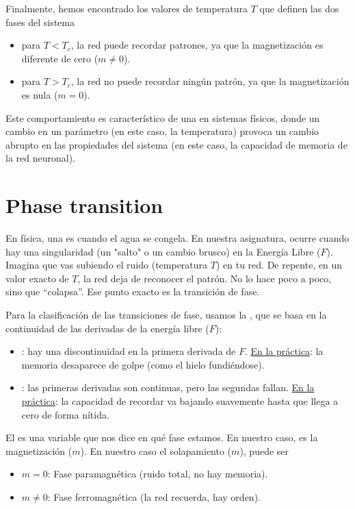 \noindent
Finalmente, hemos encontrado los valores de temperatura $T$ que definen las dos fases del sistema
\begin{itemize}
    \item {} para $T < T_c$, la red puede recordar patrones, ya que la magnetización es diferente de cero ($m \neq 0$).
    \item {} para $T > T_c$, la red no puede recordar ningún patrón, ya que la magnetización es nula ($m = 0$).
\end{itemize}
Este comportamiento es característico de una  en sistemas físicos, donde un cambio en un parámetro (en este caso, la temperatura) provoca un cambio abrupto en las propiedades del sistema (en este caso, la capacidad de memoria de la red neuronal).


\section{Phase transition}

\begin{definicion}
    En física, una  es cuando el agua se congela. En nuestra asignatura, ocurre cuando hay una singularidad (un "salto" o un cambio brusco) en la Energía Libre ($F$). Imagina que vas subiendo el ruido (temperatura $T$) en tu red. De repente, en un valor exacto de $T$, la red deja de reconocer el patrón. No lo hace poco a poco, sino que ``colapsa''. Ese punto exacto es la transición de fase. \\
\end{definicion}


\noindent
Para la clasificación de las transiciones de fase, usamos la , que se basa en la continuidad de las derivadas de la energía libre ($F$):

\begin{itemize}
    \item {}: hay una discontinuidad en la primera derivada de $F$. \underline{En la práctica}: la memoria desaparece de golpe (como el hielo fundiéndose).
    \item {}: las primeras derivadas son continuas, pero las segundas fallan. \underline{En la práctica}: la capacidad de recordar va bajando suavemente hasta que llega a cero de forma nítida.
\end{itemize}

\noindent
El  es una variable que nos dice en qué fase estamos. En nuestro caso, es la magnetización ($m$). En nuestro caso el solapamiento ($m$), puede ser 
\begin{itemize}
    \item $m = 0$: Fase paramagnética (ruido total, no hay memoria).
    \item $m \neq 0$: Fase ferromagnética (la red recuerda, hay orden).
\end{itemize}

